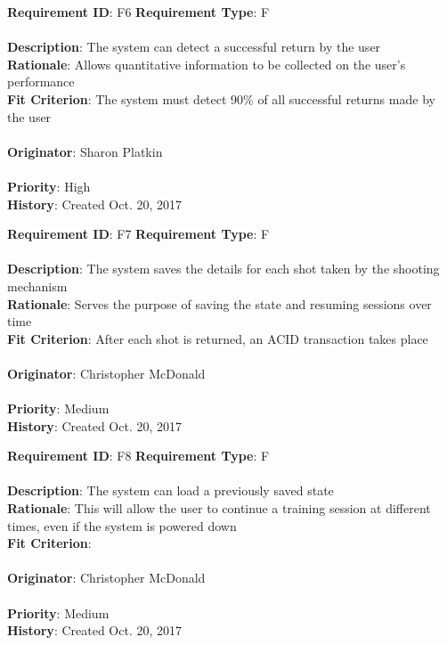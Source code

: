 \documentclass[11pt]{article}
\begin{document}
\begin{framed}
	\noindent\textbf{Requirement ID}: F6 \hfill \textbf{Requirement Type}: F \hfill\\\\
	\noindent\textbf{Description}: The system can detect a successful return by the user \\
	\textbf{Rationale}: Allows quantitative information to be collected on the user's performance \\
	\textbf{Fit Criterion}: The system must detect 90\% of all successful returns made by the user\\\\
	\textbf{Originator}: Sharon Platkin \\\\
	\textbf{Priority}: High \hfill \\
	\noindent\textbf{History}: Created Oct. 20, 2017
\end{framed}

\begin{framed}
	\noindent\textbf{Requirement ID}: F7 \hfill \textbf{Requirement Type}: F \hfill\\\\
	\noindent\textbf{Description}: The system saves the details for each shot taken by the shooting mechanism \\
	\textbf{Rationale}: Serves the purpose of saving the state and resuming sessions over time \\
	\textbf{Fit Criterion}: After each shot is returned, an ACID transaction takes place \\\\
	\textbf{Originator}: Christopher McDonald \\\\
	\textbf{Priority}: Medium \hfill \\
	\noindent\textbf{History}: Created Oct. 20, 2017
\end{framed}

\begin{framed}
	\noindent\textbf{Requirement ID}: F8 \hfill \textbf{Requirement Type}: F \hfill\\\\
	\noindent\textbf{Description}: The system can load a previously saved state \\
	\textbf{Rationale}: This will allow the user to continue a training session at different times, even if the system is powered down \\
	\textbf{Fit Criterion}: \\\\
	\textbf{Originator}: Christopher McDonald \\\\
	\textbf{Priority}: Medium \hfill \\
	\noindent\textbf{History}: Created Oct. 20, 2017
\end{framed}
\end{document}
